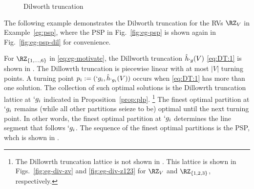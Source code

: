 \begin{figure}
\begin{center}
{
		}\hfill
	\end{center}
	\caption{Dilworth truncation}
\label{fig:eg-dt}
\end{figure}

The following example demonstrates the Dilworth truncation for the RVs $\RZ_V$ in
Example~\ref{eg:psp}, where the PSP in Fig.~\ref{fig:eg-psp} is shown again in
Fig.~\ref{fig:eg-psp-dil} for convenience.
\begin{example}
	For $\RZ_{\Set{1,\dots,6}}$ in \eqref{eq:eg-motivate}, the Dillworth truncation $\hat{h}_{`g}(V)$ \eqref{eq:DT:1} is shown
	in . The Dillowrth truncation is piecewise linear with at most $|V|$
	turning points. A turning point $p_i:=(`g_i,\hat{h}_{`g_i}(V))$ occurs when \eqref{eq:DT:1} has
	more than one solution. The collection of such optimal solutions is the Dillowrth truncation
	lattice at $`g_i$ indicated in Proposition~\ref{prop:plp}.%
	\footnote{The Dillowrth truncation lattice is
	not shown in . This lattice is shown in Figs.~\ref{fig:eg-div-zv} and
	\ref{fig:eg-div-z123} for $\RZ_V$ and $\RZ_{\Set{1,2,3}}$, respectively.}
	The finest optimal partition at $`g_i$ remains (while all other
	partitions seieze to be) optimal until the next turning point. In other words, the finest optimal
	partition at $`g_i$ determines the line segment that follows $`g_i$. The sequence of the finest
	optimal partitions is the PSP, whch is shown in . 
\end{example}


